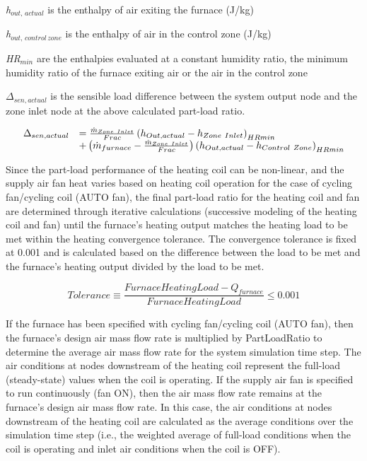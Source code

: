 \emph{h\(_{out,\, actual}\)} is the enthalpy of air exiting the furnace (J/kg)

\emph{h\(_{out,\, control\, zone}\)} is the enthalpy of air in the control zone (J/kg)

\emph{HR\(_{min}\)} are the enthalpies evaluated at a constant humidity ratio, the minimum humidity ratio of the furnace exiting air or the air in the control zone

\(\Delta_{sen,actual}\) is the sensible load difference between the system output node and the zone inlet node at the above calculated part-load ratio.

\begin{equation}
  \begin{array}{rl}
    \Delta_{sen,actual} &= \frac{\dot{m}_{Zone~Inlet}}{Frac} \PB{h_{Out,actual} - h_{Zone~Inlet}}_{HRmin} \\
                           &+ \PB{\dot{m}_{furnace} - \frac{\dot{m}_{Zone~Inlet}}{Frac}} \PB{h_{Out,actual} - h_{Control~Zone}}_{HRmin}
  \end{array}
\end{equation}

Since the part-load performance of the heating coil can be non-linear, and the supply air fan heat varies based on heating coil operation for the case of cycling fan/cycling coil (AUTO fan), the final part-load ratio for the heating coil and fan are determined through iterative calculations (successive modeling of the heating coil and fan) until the furnace's heating output matches the heating load to be met within the heating convergence tolerance. The convergence tolerance is fixed at 0.001 and is calculated based on the difference between the load to be met and the furnace's heating output divided by the load to be met.

\begin{equation}
  Tolerance \equiv \frac{FurnaceHeatingLoad - Q_{furnace}}{FurnaceHeatingLoad} \leq 0.001
\end{equation}

If the furnace has been specified with cycling fan/cycling coil (AUTO fan), then the furnace's design air mass flow rate is multiplied by PartLoadRatio to determine the average air mass flow rate for the system simulation time step. The air conditions at nodes downstream of the heating coil represent the full-load (steady-state) values when the coil is operating. If the supply air fan is specified to run continuously (fan ON), then the air mass flow rate remains at the furnace's design air mass flow rate. In this case, the air conditions at nodes downstream of the heating coil are calculated as the average conditions over the simulation time step (i.e., the weighted average of full-load conditions when the coil is operating and inlet air conditions when the coil is OFF).


